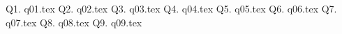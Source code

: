 

\newcommand\myincludetex[1]{\textbox{{\scriptsize \texttt{#1}}}

    
}

\newcommand\myincludesrc[1]{\textbox{{\scriptsize \texttt{#1}}}
    
    \VerbatimInput[fontsize=\footnotesize,frame=single]{#1}
}

Q1. {q01.tex}
\newpage Q2. {q02.tex}
\newpage Q3. {q03.tex}
\newpage Q4. {q04.tex}
\newpage Q5. {q05.tex}
\newpage Q6. {q06.tex}
\newpage Q7. {q07.tex}
\newpage Q8. {q08.tex}
\newpage Q9. {q09.tex}


    